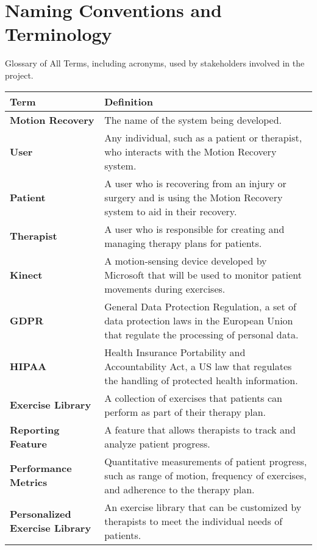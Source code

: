 \section{Naming Conventions and Terminology}
Glossary of All Terms, including acronyms, used by stakeholders involved in the project.

\begin{table}
    \centering
    \begin{tabular}{|p{}|p{}|}
        \hline
        \textbf{Term} & \textbf{Definition} \\
        \hline
        \textbf{Motion Recovery} & The name of the system being developed. \\
        \hline
        \textbf{User} & Any individual, such as a patient or therapist, who interacts with the Motion Recovery system. \\
        \hline
        \textbf{Patient} & A user who is recovering from an injury or surgery and is using the Motion Recovery system to aid in their recovery. \\
        \hline
        \textbf{Therapist} & A user who is responsible for creating and managing therapy plans for patients. \\
        \hline
        \textbf{Kinect} & A motion-sensing device developed by Microsoft that will be used to monitor patient movements during exercises. \\
        \hline
        \textbf{GDPR} & General Data Protection Regulation, a set of data protection laws in the European Union that regulate the processing of personal data. \\
        \hline
        \textbf{HIPAA} & Health Insurance Portability and Accountability Act, a US law that regulates the handling of protected health information. \\
        \hline
        \textbf{Exercise Library} & A collection of exercises that patients can perform as part of their therapy plan. \\
        \hline
        \textbf{Reporting Feature} & A feature that allows therapists to track and analyze patient progress. \\
        \hline
        \textbf{Performance Metrics} & Quantitative measurements of patient progress, such as range of motion, frequency of exercises, and adherence to the therapy plan. \\
        \hline
        \textbf{Personalized Exercise Library} & An exercise library that can be customized by therapists to meet the individual needs of patients. \\

\end{tabular}
\end{table}
